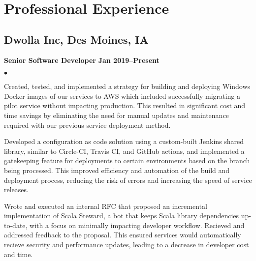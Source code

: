 \documentclass[10pt,letterpaper]{article}
\renewenvironment{itemize}{
  \begin{list}{}{
      \setlength{\leftmargin}{1.5em}
      \setlength{\itemsep}{0.25em}
      \setlength{\parskip}{0pt}
      \setlength{\parsep}{0.25em}
    }
  }{
  \end{list}
}
\newenvironment{bitemize}{
  \begin{list}{\(\bullet \)}{
      \setlength{\leftmargin}{1.5em}
      \setlength{\itemsep}{0.25em}
      \setlength{\parskip}{0pt}
      \setlength{\parsep}{0.25em}
    }
  }{
  \end{list}
}
\newcommand{\yearrange}[1]{\hfill \textbf{#1} \par}
\begin{document}
\section*{Professional Experience}

\subsection*{Dwolla Inc, Des Moines, IA}

\begin{itemize}
  \item \textbf{Senior Software Developer} \yearrange{Jan 2019--Present}
        \begin{bitemize}
          \item Created, tested, and implemented a strategy for building and deploying
          Windows Docker images of our services to AWS which included successfully
          migrating a pilot service without impacting production. This resulted in
          significant cost and time savings by eliminating the need for manual
          updates and maintenance required with our previous service deployment
          method.
          \item Developed a configuration as code solution using a custom-built
          Jenkins shared library, similar to Circle-CI, Travis CI, and GitHub
          actions, and implemented a gatekeeping feature for deployments to certain
          environments based on the branch being processed. This improved efficiency
          and automation of the build and deployment process, reducing the risk of
          errors and increasing the speed of service releases.
          \item Wrote and executed an internal RFC that proposed an incremental
          implementation of Scala Steward, a bot that keeps Scala library
          dependencies up-to-date, with a focus on minimally impacting developer
          workflow. Recieved and addressed feedback to the proposal. This ensured
          services would automatically recieve security and performance updates,
          leading to a decrease in developer cost and time.
        \end{bitemize}
\end{itemize}
\end{document}
